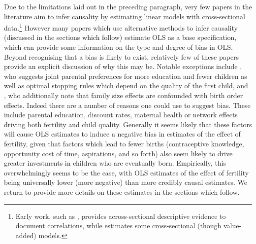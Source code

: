 Due to the limitations laid out in the preceding paragraph, very few papers in 
the literature aim to infer causality by estimating linear models with 
cross-sectional data.\footnote{Early work, such as \citet{Desai1995}, provides 
across-sectional descriptive 
evidence to document correlations, while \citet{Hanushek1992} estimates some
cross-sectional (though value-added) models.}  However many papers which use 
alternative methods to infer causality (discussed in the sections which follow)
estimate OLS as a base specification, which can provide some information on the 
type and degree of bias in OLS.  Beyond recognising that a bias is likely to 
exist, relatively few of these papers provide an explicit discussion of why this
may be.  Notable exceptions include \citet{Qian2009}, who suggests joint
parental preferences for more education and fewer children as well as optimal
stopping rules which depend on the quality of the first child, and 
\citet{Blacketal2010}, who additionally note that family size effects are 
confounded with birth order effects.  Indeed there are a number of reasons one
could use to suggest bias.  These include parental education, discount rates,
maternal health or network effects driving both fertility and child quality.  
Generally it seems likely that these factors will cause OLS estimates to 
induce a negative bias in estimates of the effect of fertility, given that 
factors which lead to fewer births (contraceptive knowledge, opportunity cost of
time, aspirations, and so forth) also seem likely to drive greater investments 
in children who are eventually born.  Empirically, this overwhelmingly seems to
be the case, with OLS estimates of the effect of fertility being universally 
lower (more negative) than more credibly causal estimates.  We return to provide
more details on these estimates in the sections which follow.

